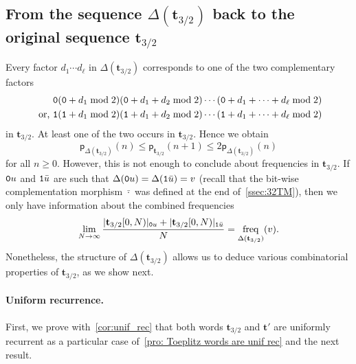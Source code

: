 \documentclass[12pt,reqno]{article}
\DeclareMathOperator{\freq}{freq}
\begin{document}

\subsection{From the sequence $\Delta(\mathbf{t}_{3/2})$ back to the original sequence $\mathbf{t}_{3/2}$}

Every factor $d_1\cdots d_\ell$ in $\Delta(\mathbf{t}_{3/2})$ corresponds to one of the two complementary factors
\begin{align*}
              & {\tt 0}({\tt 0}+d_1\bmod{2})({\tt 0}+d_1+d_2\bmod{2})\cdots ({\tt 0}+d_1+\cdots+d_\ell\bmod{2})  \\
  \text{ or, } & {\tt 1}({\tt 1}+d_1\bmod{2})({\tt 1}+d_1+d_2\bmod{2})\cdots ({\tt 1}+d_1+\cdots+d_\ell\bmod{2})
\end{align*}
in $\mathbf{t}_{3/2}$.  
At least one of the two occurs in $\mathbf{t}_{3/2}$.  Hence we obtain
\[
  \mathsf{p}_{\Delta(\mathbf{t}_{3/2})}(n) \le \mathsf{p}_{\mathbf{t}_{3/2}}(n+1)\le 2 \mathsf{p}_{\Delta(\mathbf{t}_{3/2})}(n)
\]
for all $n\ge 0$.
However, this is not enough to conclude about frequencies in $\mathbf{t}_{3/2}$. If ${\tt 0}u$ and ${\tt 1}\bar{u}$ are such that $\Delta({\tt 0}u)=\Delta({\tt 1}\bar{u})=v$ (recall that the bit-wise complementation morphism $\bar{\cdot}$ was defined at the end of~\cref{ssec:32TM}),  then we only have information about the combined frequencies
\[
  \lim_{N\to\infty} \frac{|\mathbf{t}_{3/2}[0,N)|_{{\tt 0}u}+ |\mathbf{t}_{3/2}[0,N)|_{{\tt 1}\bar{u}}}{N}=\freq_{\Delta(\mathbf{t}_{3/2})}(v).
\]
Nonetheless,  the structure of $\Delta(\mathbf{t}_{3/2})$ allows us to deduce various combinatorial properties of $\mathbf{t}_{3/2}$,  as we show next.

\paragraph{Uniform recurrence.} First,  we prove with~\cref{cor:unif_rec} that both words $\mathbf{t}_{3/2}$ and $\mathbf{t}'$ are uniformly recurrent as a particular case of~\cref{pro: Toeplitz words are unif rec} and the next result.
\end{document}
